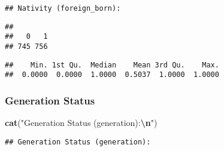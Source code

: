 \documentclass[
]{article}
\newenvironment{Shaded}{\begin{snugshade}}{\end{snugshade}}
\newcommand{\AttributeTok}[1]{\textcolor[rgb]{0.13,0.29,0.53}{#1}}
\newcommand{\FunctionTok}[1]{\textcolor[rgb]{0.13,0.29,0.53}{\textbf{#1}}}
\newcommand{\NormalTok}[1]{#1}
\newcommand{\SpecialCharTok}[1]{\textcolor[rgb]{0.81,0.36,0.00}{\textbf{#1}}}
\newcommand{\StringTok}[1]{\textcolor[rgb]{0.31,0.60,0.02}{#1}}
\begin{document}
\begin{verbatim}
## Nativity (foreign_born):
\end{verbatim}

\begin{Shaded}
\end{Shaded}

\begin{verbatim}
## 
##   0   1 
## 745 756
\end{verbatim}

\begin{Shaded}
\end{Shaded}

\begin{verbatim}
##    Min. 1st Qu.  Median    Mean 3rd Qu.    Max. 
##  0.0000  0.0000  1.0000  0.5037  1.0000  1.0000
\end{verbatim}

\subsubsection{Generation Status}\label{generation-status-1}

\begin{Shaded}
\begin{Highlighting}[]
\FunctionTok{cat}\NormalTok{(}\StringTok{"Generation Status (generation):}\SpecialCharTok{\textbackslash{}n}\StringTok{"}\NormalTok{)}
\end{Highlighting}
\end{Shaded}

\begin{verbatim}
## Generation Status (generation):
\end{verbatim}

\begin{Shaded}
\end{Shaded}
\end{document}
